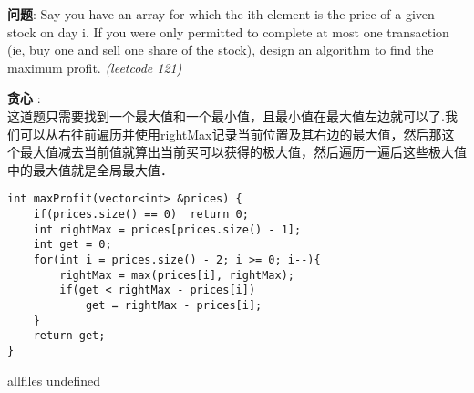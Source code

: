 \documentclass{article}
\begin{document}
\begin{CJK}{UTF8}{gbsn}     %

\else
    
\begin{description}
    \item{\textbf{问题}}: Say you have an array for which the ith element is the price of a given stock on day i. If you were only permitted to complete at most one transaction (ie, buy one and sell one share of the stock), design an algorithm to find the maximum profit. \textit{(leetcode 121)}
    \item{\textbf{贪心}} : 
    \\这道题只需要找到一个最大值和一个最小值，且最小值在最大值左边就可以了.我们可以从右往前遍历并使用rightMax记录当前位置及其右边的最大值，然后那这个最大值减去当前值就算出当前买可以获得的极大值，然后遍历一遍后这些极大值中的最大值就是全局最大值．
    \begin{lstlisting}
int maxProfit(vector<int> &prices) {
	if(prices.size() == 0)	return 0;
	int rightMax = prices[prices.size() - 1];
	int get = 0;
	for(int i = prices.size() - 2; i >= 0; i--){
		rightMax = max(prices[i], rightMax);
		if(get < rightMax - prices[i])
			get = rightMax - prices[i];
	}
	return get;
}
    \end{lstlisting}
\end{description}

\fi

\ifx allfiles undefined
\end{CJK}
\end{document}
